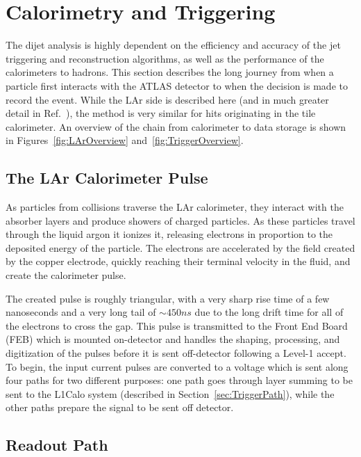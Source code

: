 
\chapter{Calorimetry and Triggering}
\label{ch:Calorimetry}
The dijet analysis is highly dependent on the efficiency and accuracy of the jet triggering and reconstruction algorithms, as well as the performance of the calorimeters to hadrons.  This section describes the long journey from when a particle first interacts with the ATLAS detector to when the decision is made to record the event.  While the LAr side is described here (and in much greater detail in Ref.~\cite{LArTDR}), the method is very similar for hits originating in the tile calorimeter.  An overview of the chain from calorimeter to data storage is shown in Figures~\ref{fig:LArOverview} and~\ref{fig:TriggerOverview}.

\section{The LAr Calorimeter Pulse}

As particles from collisions traverse the LAr calorimeter, they interact with the absorber layers and produce showers of charged particles.  As these particles travel through the liquid argon it ionizes it, releasing electrons in proportion to the deposited energy of the particle.  The electrons are accelerated by the field created by the copper electrode, quickly reaching their terminal velocity in the fluid, and create the calorimeter pulse.

The created pulse is roughly triangular, with a very sharp rise time of a few nanoseconds and a very long tail of $\sim450 ns$ due to the long drift time for all of the electrons to cross the gap.  This pulse is transmitted to the Front End Board (FEB) which is mounted on-detector and handles the shaping, processing, and digitization of the pulses before it is sent off-detector following a Level-1 accept.  To begin, the input current pulses are converted to a voltage which is sent along four paths for two different purposes: one path goes through layer summing to be sent to the L1Calo system (described in Section~\ref{sec:TriggerPath}), while the other paths prepare the signal to be sent off detector.

\section{Readout Path}

